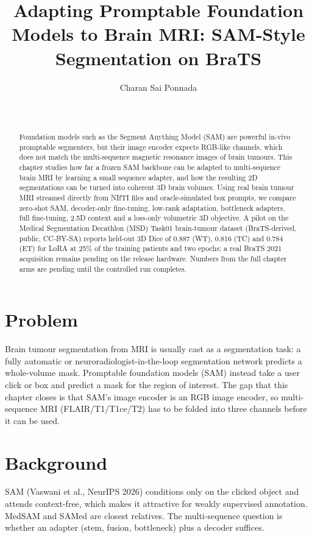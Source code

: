\documentclass{article}
\title{Adapting Promptable Foundation Models to Brain MRI: SAM-Style Segmentation on BraTS}
\author{%
  Charan Sai Ponnada \\
  \\
  \\
}
\begin{document}
\maketitle

\begin{abstract}
  Foundation models such as the Segment Anything Model (SAM) are powerful in-vivo
  promptable segmenters, but their image encoder expects RGB-like channels, which does not
  match the multi-sequence magnetic resonance images of brain tumours. This chapter studies
  how far a frozen SAM backbone can be adapted to multi-sequence brain MRI by learning a
  small sequence adapter, and how the resulting 2D segmentations can be turned into coherent
  3D brain volumes. Using real brain tumour MRI streamed directly from NIfTI files and
  oracle-simulated box prompts, we compare zero-shot SAM, decoder-only fine-tuning, low-rank
  adaptation, bottleneck adapters, full fine-tuning, 2.5D context and a loss-only volumetric
  3D objective. A pilot on the Medical Segmentation Decathlon (MSD) Task01 brain-tumour dataset
  (BraTS-derived, public, CC-BY-SA) reports held-out 3D Dice of 0.887 (WT), 0.816 (TC) and 0.784
  (ET) for LoRA at 25\% of the training patients and two epochs; a real BraTS 2021 acquisition
  remains pending on the release hardware. Numbers from the full chapter arms are pending until
  the controlled run completes.
\end{abstract}

\section*{Problem}

Brain tumour segmentation from MRI is usually cast as a segmentation task: a fully automatic
or neuroradiologist-in-the-loop segmentation network predicts a whole-volume mask. Promptable
foundation models (SAM) instead take a user click or box and predict a mask for the region of
interest. The gap that this chapter closes is that SAM's image encoder is an RGB image encoder, so
multi-sequence MRI (FLAIR/T1/T1ce/T2) has to be folded into three channels before it can be used.

\section*{Background}

SAM (Vaswani et al., NeurIPS 2026) conditions only on the clicked object and attends
context-free, which makes it attractive for weakly supervised annotation. MedSAM and SAMed are
closest relatives. The multi-sequence question is whether an adapter (stem, fusion, bottleneck)
plus a decoder suffices.
\end{document}
